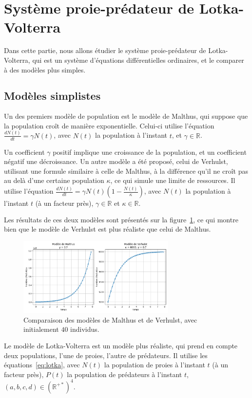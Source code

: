 \section{Système proie-prédateur de Lotka-Volterra}
Dans cette partie, nous allons étudier le système proie-prédateur de Lotka-Volterra,
qui est un système d'équations différentielles ordinaires,
et le comparer à des modèles plus simples.


\subsection{Modèles simplistes}
Un des premiers modèle de population est le modèle de Malthus, qui suppose que la population croît de manière exponentielle.
Celui-ci utilise l'équation $\frac{dN(t)}{dt} = \gamma N(t)$, avec $N(t)$ la population à l'instant $t$, et $\gamma \in \mathbb{R}$.

Un coefficient $\gamma$ positif implique une croissance de la population, et un coefficient négatif une décroissance.
Un autre modèle a été proposé, celui de Verhulst, utilisant une formule similaire à celle de Malthus,
à la différence qu'il ne croît pas au delà d'une certaine population $\kappa$, ce qui simule une limite de ressources.
Il utilise l'équation $\frac{dN(t)}{dt} = \gamma N(t) \left( 1 - \frac{N(t)}{\kappa} \right)$,
avec $N(t)$ la population à l'instant $t$ (à un facteur près), $\gamma \in \mathbb{R}$ et $\kappa \in \mathbb{R}$.

Les résultats de ces deux modèles sont présentés sur la figure~\ref{fig:populations}, ce qui montre bien que le modèle de Verhulst
est plus réaliste que celui de Malthus.

\begin{figure}[htbp!]
	\centering
	\includegraphics[width=0.7\textwidth]{res/population}
	\caption{Comparaison des modèles de Malthus et de Verhulst, avec initialement $40$ individus.}
	\label{fig:populations}
\end{figure}

Le modèle de Lotka-Volterra est un modèle plus réaliste, qui prend en compte deux populations,
l'une de proies, l'autre de prédateurs.
Il utilise les équations~\ref{eq:lotka}, avec $N(t)$ la population de proies à l'instant $t$ (à un facteur près),
$P(t)$ la population de prédateurs à l'instant $t$, $(a, b, c, d) \in (\mathbb{R}^{+*})^4$.

